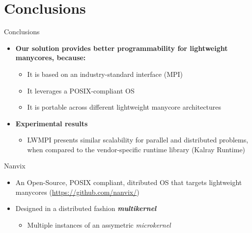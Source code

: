 \documentclass[english,aspectratio=169]{lapesd-slides}
\begin{document}
  \section{Conclusions}
    \begin{frame}{Conclusions}
      \begin{itemize}
      	\item \textbf{Our solution provides better programmability for lightweight manycores, because:}
        \begin{itemize}
           \item It is based on an industry-standard interface (MPI)
           \item It leverages a POSIX-compliant OS
           \item It is portable across different lightweight manycore architectures
       \end{itemize}
	
	\vspace{0.5cm}

        \item \textbf{Experimental results}
        \begin{itemize}
	   \item LWMPI presents similar scalability for parallel and distributed problems, when compared
	   to the vendor-specific runtime library (Kalray Runtime)
       \end{itemize}
      \end{itemize}
    \end{frame}


  \stopcountingframes


  \thanksframe

  \begin{backup}

    \begin{frame}{Nanvix}
      \begin{itemize}
        \item An Open-Source, POSIX compliant, ditributed OS that targets lightweight
          manycores (\url{https://github.com/nanvix/})
        \item Designed in a distributed fashion \textbf{\textit{multikernel}}
        \begin{itemize}
          \item Multiple instances of an assymetric \textit{microkernel}
        \end{itemize}
      \end{itemize}

    \end{frame}

  \end{backup}
\end{document}
